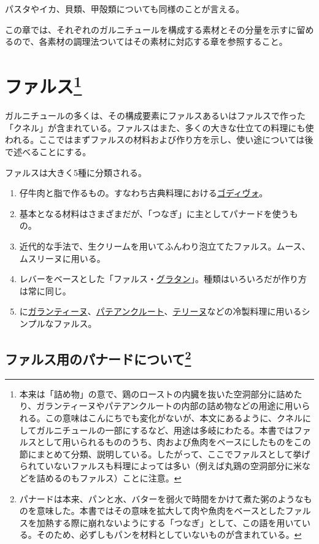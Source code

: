 \begin{Main}
パスタやイカ、貝類、甲殻類についても同様のことが言える。

この章では、それぞれのガルニチュールを構成する素材とその分量を示すに留めるので、各素材の調理法ついてはその素材に対応する章を参照すること。

\hypertarget{serie-des-farces-diverses}{%
\section[ファルス]{\texorpdfstring{ファルス\footnote{本来は「詰め物」の意で、鶏のローストの内臓を抜いた空洞部分に詰めたり、ガランティーヌやパテアンクルートの内部の詰め物などの用途に用いられる。この意味はこんにちでも変化がないが、本文にあるように、クネルにしてガルニチュールの一部にするなど、用途は多岐にわたる。本書ではファルスとして用いられるもののうち、肉および魚肉をベースにしたものをこの節にまとめて分類、説明している。したがって、ここでファルスとして挙げられていないファルスも料理によっては多い（例えば丸鶏の空洞部分に米などを詰めるのもファルス）ことに注意。}}{ファルス}}\label{serie-des-farces-diverses}}


 

ガルニチュールの多くは、その構成要素にファルスあるいはファルスで作った「クネル」が含まれている。ファルスはまた、多くの大きな仕立ての料理にも使われる。ここではまずファルスの材料および作り方を示し、使い途については後で述べることにする。

ファルスは大きく5種に分類される。

\begin{enumerate}
\def\labelenumi{\arabic{enumi}.}
\item
  仔牛肉と脂で作るもの。すなわち古典料理における\ul{ゴディヴォ}。
\item
  基本となる材料はさまざまだが、「つなぎ」に主としてパナードを使うもの。
\item
  近代的な手法で、生クリームを用いてふんわり泡立てたファルス。ムース、ムスリーヌに用いる。
\item
  レバーをベースとした「ファルス・\ul{グラタン}」。種類はいろいろだが作り方は常に同じ。
\item
  に\protect\hyperlink{}{ガランティーヌ}、\protect\hyperlink{}{パテアンクルート}、\protect\hyperlink{}{テリーヌ}などの冷製料理に用いるシンプルなファルス。
\end{enumerate}

\hypertarget{les-panades-pour-farces}{%
\subsection[ファルス用のパナードについて]{\texorpdfstring{ファルス用のパナードについて\footnote{パナードは本来、パンと水、バターを弱火で時間をかけて煮た粥のようなものを意味した。本書ではその意味を拡大して肉や魚肉をベースとしたファルスを加熱する際に崩れないようにする「つなぎ」として、この語を用いている。そのため、必ずしもパンを材料としていないものが含まれている。}}{ファルス用のパナードについて}}\label{les-panades-pour-farces}}


\end{Main}
